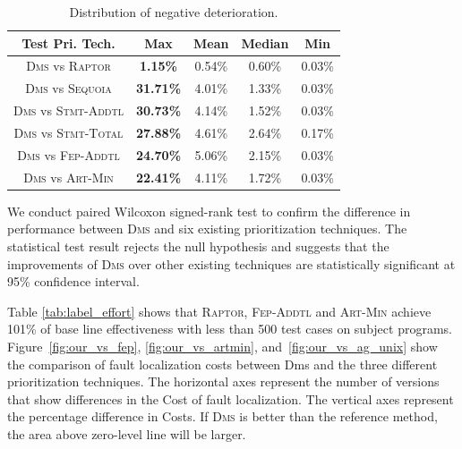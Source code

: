 \begin{table}[tbp]
    \centering
		\caption{Distribution of negative deterioration.}
		\renewcommand{\arraystretch}{1.5}
		\small
        \begin{tabular}{|c|c|c|c|c|}
			\hline
			Test Pri. Tech.  &        Max &       Mean &     Median &        Min \\
			\hline\hline
			\textsc{Dms} vs \textsc{Raptor} & {\bf 1.15\%} &     0.54\% &     0.60\% &     0.03\% \\
			\hline
			\textsc{Dms} vs \textsc{Sequoia} & {\bf 31.71\%} &    4.01\% &     1.33\% &     0.03\% \\
			\hline
			\textsc{Dms} vs \textsc{Stmt-Addtl} & {\bf 30.73\%} &    4.14\% &     1.52\% &     0.03\% \\
			\hline
			\textsc{Dms} vs \textsc{Stmt-Total} & {\bf 27.88\%} &    4.61\% &    2.64\% &     0.17\% \\
			\hline
			\textsc{Dms} vs \textsc{Fep-Addtl} & {\bf 24.70\%} &    5.06\% &     2.15\% &     0.03\% \\
			\hline
			\textsc{Dms} vs \textsc{Art-Min} & {\bf 22.41\%} &     4.11\% &     1.72\% &     0.03\% \\
			\hline
		\end{tabular}
    \label{tab:compare_31}
\end{table}


We conduct paired Wilcoxon signed-rank test to confirm the difference in performance between \textsc{Dms} and six existing prioritization techniques.
The statistical test result rejects the null hypothesis and suggests that the improvements of \textsc{Dms} over other existing techniques 
are statistically significant
at 95\% confidence interval.

\vspace{0.2cm}
 Table \ref{tab:label_effort} shows that \textsc{Raptor}, \textsc{Fep-Addtl} and \textsc{Art-Min} achieve 101\% of base line effectiveness with less than 500 test cases on subject programs.
Figure~\ref{fig:our_vs_fep}, \ref{fig:our_vs_artmin}, and~\ref{fig:our_vs_ag_unix}
show the comparison of fault localization costs between {\sc Dms} and the three different
prioritization techniques.
The horizontal axes represent the number of versions that
show differences in the Cost of
fault localization. The vertical axes represent the percentage
difference in Costs. If \textsc{Dms} is better than the reference
method, the area above zero-level line will be larger.

